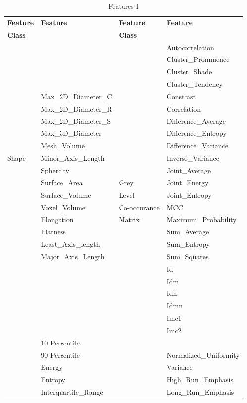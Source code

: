 \documentclass[final,1p,times,twocolumn]{elsarticle}
\begin{document}

\begin{table}[!b]
\scriptsize
\centering
\caption{Features-I}
\label{tb3}
\begin{tabular}{| l | l | l | l |}
\hline
\textbf{Feature} & \textbf{Feature} & \textbf{Feature} & \textbf{Feature}\\
\textbf{Class}&&\textbf{Class}&\\
\hline
& &&Autocorrelation\\
&&&Cluster\_Prominence\\
&&&Cluster\_Shade\\
&&&Cluster\_Tendency\\
&Max\_2D\_Diameter\_C&&Constrast\\
&Max\_2D\_Diameter\_R&&Correlation\\
&Max\_2D\_Diameter\_S&&Difference\_Average\\
&Max\_3D\_Diameter&&Difference\_Entropy\\
&Mesh\_Volume&&Difference\_Variance\\
Shape&Minor\_Axis\_Length&&Inverse\_Variance\\
&Sphercity&&Joint\_Average\\
&Surface\_Area&Grey&Joint\_Energy\\
&Surface\_Volume&Level&Joint\_Entropy\\
&Voxel\_Volume&Co-occurance&MCC\\
&Elongation &Matrix&Maximum\_Probability\\
&Flatness&&Sum\_Average\\
&Least\_Axis\_length&&Sum\_Entropy\\
&Major\_Axis\_Length&&Sum\_Squares\\
&&&Id\\
&&&Idm\\
&&&Idn\\
&&&Idmn\\
&&&Imc1\\
&&&Imc2\\
\hline
&10 Percentile&&\\
&90 Percentile&&Normalized\_Uniformity\\
&Energy&&Variance\\
&Entropy&&High\_Run\_Emphasis\\
&Interquartile\_Range&&Long\_Run\_Emphasis\\

\end{tabular}
\end{table}
\end{document}
